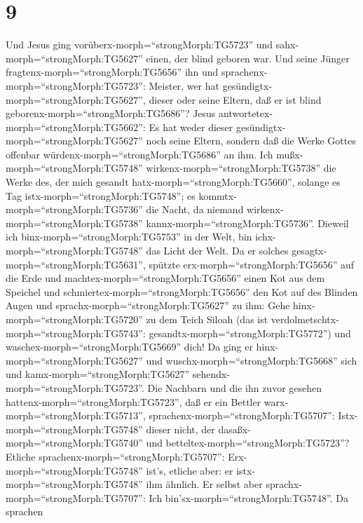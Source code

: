 \hypertarget{section-8}{%
\section{9}\label{section-8}}

 Und Jesus ging vorüberx-morph=``strongMorph:TG5723'' und
sahx-morph=``strongMorph:TG5627'' einen, der blind geboren war.
 Und seine Jünger fragtenx-morph=``strongMorph:TG5656'' ihn
und sprachenx-morph=``strongMorph:TG5723'': Meister, wer hat
gesündigtx-morph=``strongMorph:TG5627'', dieser oder seine Eltern, daß
er ist blind geborenx-morph=``strongMorph:TG5686''?  Jesus
antwortetex-morph=``strongMorph:TG5662'': Es hat weder dieser
gesündigtx-morph=``strongMorph:TG5627'' noch seine Eltern, sondern daß
die Werke Gottes offenbar würdenx-morph=``strongMorph:TG5686'' an ihm.
 Ich mußx-morph=``strongMorph:TG5748''
wirkenx-morph=``strongMorph:TG5738'' die Werke des, der mich gesandt
hatx-morph=``strongMorph:TG5660'', solange es Tag
istx-morph=``strongMorph:TG5748''; es
kommtx-morph=``strongMorph:TG5736'' die Nacht, da niemand
wirkenx-morph=``strongMorph:TG5738'' kannx-morph=``strongMorph:TG5736''.
 Dieweil ich binx-morph=``strongMorph:TG5753'' in der Welt,
bin ichx-morph=``strongMorph:TG5748'' das Licht der Welt. 
Da er solches gesagtx-morph=``strongMorph:TG5631'', spützte
erx-morph=``strongMorph:TG5656'' auf die Erde und
machtex-morph=``strongMorph:TG5656'' einen Kot aus dem Speichel und
schmiertex-morph=``strongMorph:TG5656'' den Kot auf des Blinden Augen
 und sprachx-morph=``strongMorph:TG5627'' zu ihm: Gehe
hinx-morph=``strongMorph:TG5720'' zu dem Teich Siloah (das ist
verdolmetschtx-morph=``strongMorph:TG5743'':
gesandtx-morph=``strongMorph:TG5772'') und
waschex-morph=``strongMorph:TG5669'' dich! Da ging er
hinx-morph=``strongMorph:TG5627'' und
wuschx-morph=``strongMorph:TG5668'' sich und
kamx-morph=``strongMorph:TG5627'' sehendx-morph=``strongMorph:TG5723''.
 Die Nachbarn und die ihn zuvor gesehen
hattenx-morph=``strongMorph:TG5723'', daß er ein Bettler
warx-morph=``strongMorph:TG5713'',
sprachenx-morph=``strongMorph:TG5707'':
Istx-morph=``strongMorph:TG5748'' dieser nicht, der
dasaßx-morph=``strongMorph:TG5740'' und
betteltex-morph=``strongMorph:TG5723''?  Etliche
sprachenx-morph=``strongMorph:TG5707'': Erx-morph=``strongMorph:TG5748''
ist's, etliche aber: er istx-morph=``strongMorph:TG5748'' ihm ähnlich.
Er selbst aber sprachx-morph=``strongMorph:TG5707'': Ich
bin'sx-morph=``strongMorph:TG5748''.  Da sprachen
